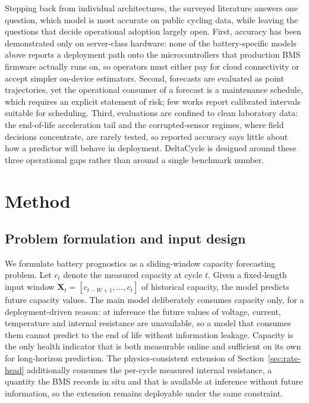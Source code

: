 \documentclass[final,5p,times,twocolumn]{elsarticle}
\begin{document}
Stepping back from individual architectures, the surveyed literature
answers one question, which model is most accurate on public cycling
data, while leaving the questions that decide operational adoption
largely open. First, accuracy has been demonstrated only on
server-class hardware: none of the battery-specific models above
reports a deployment path onto the microcontrollers that production
BMS firmware actually runs on, so operators must either pay for
cloud connectivity or accept simpler on-device estimators. Second,
forecasts are evaluated as point trajectories, yet the operational
consumer of a forecast is a maintenance schedule, which requires an
explicit statement of risk; few works report calibrated intervals
suitable for scheduling. Third, evaluations are confined to clean
laboratory data: the end-of-life acceleration tail and the
corrupted-sensor regimes, where field decisions concentrate, are
rarely tested, so reported accuracy says little about how a
predictor will behave in deployment. DeltaCycle is designed around
these three operational gaps rather than around a single benchmark
number.

\section{Method}
\label{sec:method}

\subsection{Problem formulation and input design}
\label{sec:formulation}

We formulate battery prognostics as a sliding-window capacity
forecasting problem. Let $c_t$ denote the measured capacity at cycle
$t$. Given a fixed-length input window
$\mathbf{X}_{t} = [c_{t-W+1}, \ldots, c_t]$ of historical capacity,
the model predicts future capacity values. The main model
deliberately consumes capacity only, for a deployment-driven
reason: at inference the future values of voltage, current,
temperature and internal resistance are unavailable, so a model that
consumes them cannot predict to the end of life without information
leakage. Capacity is the only health indicator that is both
measurable online and sufficient on its own for long-horizon
prediction. The physics-consistent extension of
Section~\ref{sec:rate-head} additionally consumes the per-cycle
measured internal resistance, a quantity the BMS records in
situ and that is available at inference without future information, so the
extension remains deployable under the same constraint.
\end{document}
